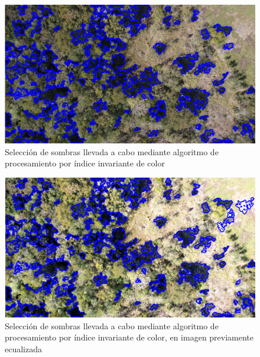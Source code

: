 \begin{figure}
    \includegraphics[width=\textwidth]{Imagenes/Comparativo Homo-IIC/180_IIC.png}
     \hfill
     \caption{Selección de sombras llevada a cabo mediante algoritmo de procesamiento por índice invariante de color}
    \label{180_iic}
\end{figure}
\begin{figure}
    \includegraphics[width=\textwidth]{Imagenes/Comparativo Homo-IIC/180_eq_IIC.png}
     \hfill
     \caption{Selección de sombras llevada a cabo mediante algoritmo de procesamiento por índice invariante de color, en imagen previamente ecualizada}
    \label{180_eq_iic}
\end{figure}